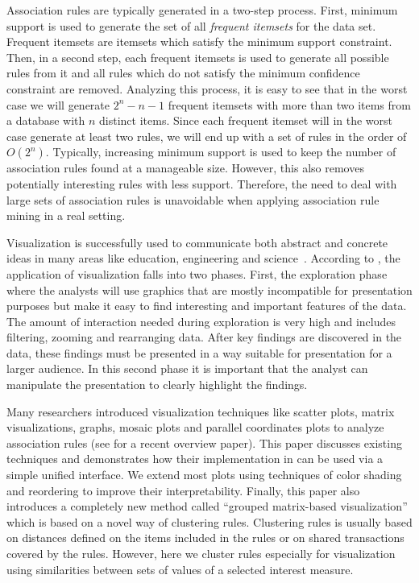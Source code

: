 \documentclass[nojss]{jss}
\begin{document}
Association rules are typically generated in a two-step process. First, minimum
support is used to generate the set of all {\em frequent itemsets} for the data
set. Frequent itemsets are itemsets which satisfy the minimum support
constraint. Then, in a second step, each frequent itemsets is used to generate
all possible rules from it and all rules which do not satisfy the minimum
confidence constraint are removed.
Analyzing this process, it is easy to see that in
the worst case we will generate
$2^n-n-1$ frequent itemsets
with more than two items
from a database with $n$ distinct items.
Since each frequent itemset will in the worst case generate at least two rules,
we will end up with a set of rules in the order of $O(2^n)$.
Typically, increasing minimum support is used to keep the number of association
rules found at a manageable size. However, this also removes potentially
interesting rules with less support. Therefore, the need to deal with
large sets of association rules is
unavoidable when applying association rule mining in a real setting.

Visualization is successfully used to communicate both abstract and concrete
ideas in many areas like education, engineering and
science~\citep{arulesViz:Prangsmal:2009}.
According to \cite{arulesViz:Chen:2008}, the application of visualization
falls into two phases.
First, the exploration phase where the
analysts will use graphics that are mostly incompatible for presentation
purposes but make it easy to find interesting and important features
of the data. The amount of interaction needed during exploration is very high
and includes filtering, zooming and rearranging data.
After key findings are discovered in the data, these findings must be presented
in a way suitable for presentation for a larger audience.
In this second phase it is important that the analyst can manipulate the
presentation to clearly highlight the findings.

Many researchers introduced visualization techniques
like scatter plots, matrix visualizations, graphs, mosaic plots
and parallel coordinates plots to analyze association rules
(see \cite{arulesViz:Bruzzese:2008} for a recent overview paper).
This paper discusses existing techniques and
demonstrates how their implementation in 
can be used via a simple unified interface.
We extend most plots using techniques of color shading and reordering to
improve their interpretability.
Finally, this paper also introduces a completely new method
called ``grouped matrix-based visualization'' which is based on a novel
way of clustering rules.
Clustering rules is usually based on distances defined on the items included
in the rules or on shared transactions covered by the rules. However,
here we cluster rules especially for visualization using similarities between
sets of values of a selected interest measure.
\end{document}
